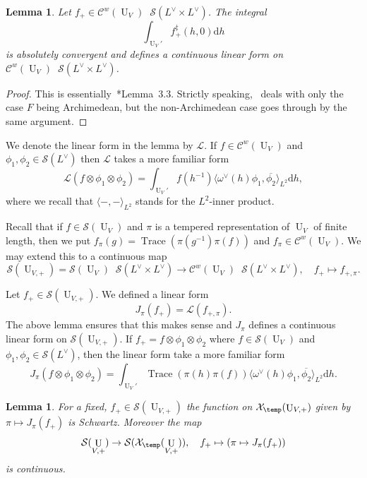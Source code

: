 \documentclass[letterpaper,11pt]{amsart}
\newcommand{\cC}{\mathcal{C}}
\newcommand{\cL}{\mathcal{L}}
\newcommand{\cS}{\mathcal{S}}
\newcommand{\cX}{\mathcal{X}}
\newcommand{\rd}{\mathrm{d}}
\newcommand{\<}{\negthickspace}
\DeclareMathOperator{\Trace}{Trace}
\DeclareMathOperator{\U}{U}
\DeclareMathOperator{\otimeshat}{\widehat{\otimes}}
\theoremstyle{definition}
\theoremstyle{plain}
\newtheorem{lemma}[definition]{Lemma}
\theoremstyle{remark}
\numberwithin{equation}{section}
\begin{document}
\begin{lemma}   \label{lemma:J_pi_convergence}
Let $f_+ \in \cC^w(\U_V)\otimeshat \cS(L^\vee \times L^\vee)$. The integral
    \[
    \int_{\U_V'} f_+^\ddag(h, 0) \rd h
    \]
is absolutely convergent and defines a continuous linear form on $\cC^w(\U_V)
\otimeshat \cS(L^\vee \times L^\vee)$.
\end{lemma}

\begin{proof}
This is essentially~\cite{Xue4}*{Lemma~3.3}. Strictly speaking,~\cite{Xue4}
deals with only the case $F$ being Archimedean, but the non-Archimedean case
goes through by the same argument.
\end{proof}

We denote the linear form in the lemma by $\cL$. If $f \in \cC^w(\U_V)$ and
$\phi_1, \phi_2 \in \cS(L^\vee)$ then $\cL$ takes a more familiar form
\begin{equation}
\label{eq:relative_char_unitary_familiar_form}
  \cL(f \otimes \phi_1 \otimes \phi_2) =
    \int_{\U_V'} f(h^{-1}) \langle \omega^\vee(h) \phi_1,
    \overline{\phi_2} \rangle_{L^2} \rd h,
\end{equation}
where we recall that $\langle-,-\rangle_{L^2}$ stands for the $L^2$-inner product.


Recall that if $f \in \cS(\U_V)$ and $\pi$ is a tempered representation of
$\U_V$ of finite length, then we put $f_{\pi}(g) = \Trace(\pi(g^{-1})\pi(f))$
and $f_{\pi} \in \cC^w(\U_V)$. We may extend this to a continuous map
    \[
    \cS(\U_{V, +}) =
    \cS(\U_V) \otimeshat \cS(L^\vee \times L^\vee) \to
    \cC^w(\U_V) \otimeshat \cS(L^\vee \times L^\vee), \quad
     f_+ \mapsto f_{+, \pi}.
    \]

Let $f_+ \in \cS(\U_{V, +})$. We defined a linear form
    \[
    J_{\pi}(f_+) = \cL(f_{+, \pi}).
    \]
The above lemma ensures that this makes sense and $J_{\pi}$ defines a
continuous linear form on $\cS(\U_{V, +})$. If $f_+ = f \otimes \phi_1
\otimes \phi_2$ where $f \in \cS(\U_V)$ and $\phi_1, \phi_2 \in
\cS(L^\vee)$, then the linear form take a more familiar form
    \[
    J_{\pi}(f \otimes \phi_1 \otimes \phi_2) =
    \int_{\U_V'} \Trace (\pi(h) \pi(f))
    \langle \omega^\vee(h) \phi_1,
    \overline{\phi_2} \rangle_{L^2} \rd h.
    \]

\begin{lemma}   \label{lemma:J_pi_continuity}
For a fixed, $f_+ \in \cS(\U_{V,+})$ the function on $\cX_{\temp}(\U_{V, +})$
given by $\pi \mapsto J_{\pi}(f_+)$ is Schwartz. Moreover the map
    \[
    \cS(\U_{V,+}) \to \cS(\cX_{\temp}(\U_{V, +})), \quad
    f_+ \mapsto (\pi \mapsto J_{\pi}(f_+))
    \]
is continuous.
\end{lemma}
\end{document}
